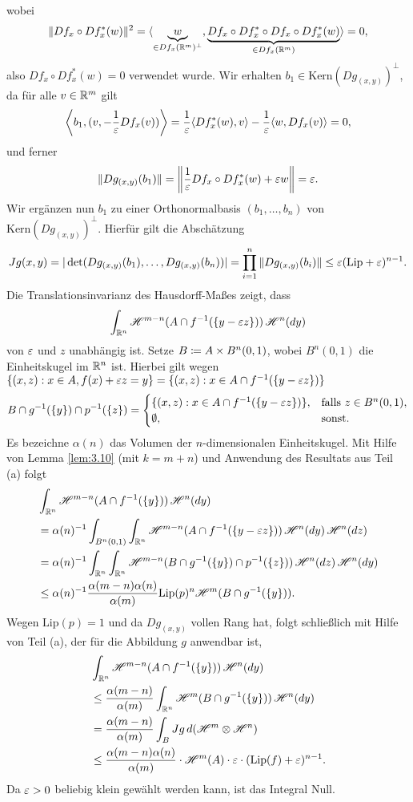 \documentclass[a4paper,twoside,DIV15,BCOR12mm]{scrbook}
\newcommand{\HM}{\mathscr H}
\begin{document}
\begin{beweis}
\begin{enumerate}[\quad(a)]
$$$$
wobei
$$ 
\|Df_x\circ Df_x^*(w)\|^2=\langle \underbrace{w}_{\in Df_x(\mathbb{R}^m)^\perp},\underbrace{Df_x\circ Df_x^*\circ Df_x\circ Df_x^*(w)}_{\in Df_x(\mathbb{R}^m)}\rangle=0,
$$
also $Df_x\circ Df_x^*(w)=0$ verwendet wurde. Wir erhalten $b_1\in \text{Kern}(Dg_{(x,y)})^\perp$, da für alle 
$v\in\mathbb{R}^m$ gilt
$$
\left\langle b_1,(v,-\frac{1}{\varepsilon}Df_x(v))\right\rangle=\frac{1}{\varepsilon}\langle Df_x^*(w),v\rangle -\frac{1}{\varepsilon}\langle
w,Df_x(v)\rangle =0,
$$
und ferner
$$
\|Dg_{(x,y)}(b_1)\|=\left\|\frac{1}{\varepsilon} Df_x\circ Df_x^*(w)+\varepsilon w\right\|=\varepsilon.
$$
Wir ergänzen nun $b_1$ zu einer Orthonormalbasis $(b_1,\ldots,b_n)$ von $\text{Kern}(Dg_{(x,y)})^\perp$. 
Hierfür gilt die Abschätzung
$$
Jg(x,y)=|\det(Dg_{(x,y)}(b_1),\ldots, Dg_{(x,y)}(b_n))|=
\prod_{i=1}^n\|Dg_{(x,y)}(b_i)\|\le \varepsilon(\text{Lip}+\varepsilon)^{n-1}.
$$
Die Translationsinvarianz des Hausdorff-Maßes zeigt, dass
$$
\int_{\MdR^n}\HM^{m-n}(A\cap f^{-1}(\{y-\ep z\}))\, \HM^n(dy)
$$
von $\varepsilon$ und $z$ unabhängig ist. Setze $B\da A\times B^n(0,1)$, wobei $B^n(0,1)$ die Einheitskugel im $\mathbb{R}^n$ ist. 
Hierbei gilt wegen $\{(x,z):x\in A,f(x)+\varepsilon z=y\}=\{(x,z):x\in A\cap f^{-1}(\{y-\varepsilon z\})\}$ 
$$
B\cap g^{-1}(\{y\})\cap p^{-1}(\{z\})
=\begin{cases}
\{(x,z):x\in A\cap f^{-1}(\{y-\varepsilon z\})\},& \text{falls } z\in B^n(0,1),\\
\emptyset,&\text{sonst}.
\end{cases}
$$
Es bezeichne $\alpha(n)$ das Volumen der $n$-dimensionalen Einheitskugel. 
Mit Hilfe von Lemma \ref{lem:3.10} (mit $k=m+n$) und Anwendung des Resultats aus Teil (a) folgt
\begin{align*}
&\int_{\MdR^n}\HM^{m-n}(A\cap f^{-1}(\{y\}))\,\HM^n(dy)\\
&=\alpha(n)^{-1}\int_{B^n(0,1)}\int_{\MdR^n}\HM^{m-n}(A\cap f^{-1}(\{y-\ep z\}))\,\HM^n(dy)\, \HM^n(dz)\\
&=\alpha(n)^{-1}\int_{\MdR^n}\int_{\MdR^n}\HM^{m-n}(B\cap g^{-1}(\{y\})\cap p^{-1}(\{z\}))\,\HM^n(dz)\, \HM^n(dy)\\
&\le \alpha(n)^{-1}\frac{\alpha(m-n)\alpha(n)}{\alpha(m)}\text{Lip}(p)^n\HM^m(B\cap g^{-1}(\{y\})).
\end{align*}
Wegen $\text{Lip}(p)=1$ und da $Dg_{(x,y)}$ vollen Rang hat, folgt schließlich mit Hilfe von 
Teil (a), der für die Abbildung $g$ anwendbar ist,
\begin{align*}
&\int_{\MdR^n}\HM^{m-n}(A\cap f^{-1}(\{y\}))\,\HM^n(dy)\\
&\le\frac{\alpha(m-n)}{\alpha(m)}\int_{\MdR^n}\HM^m(B\cap g^{-1}(\{y\}))\, \HM^n(dy)\\
&=\frac{\alpha(m-n)}{\alpha(m)}\int_{B}Jg\, d(\HM^m\otimes\HM^n)\\
&\le \frac{\alpha(m-n)\alpha(n)}{\alpha(m)}\cdot\HM^m(A)\cdot \ep\cdot(\text{Lip}(f)+\ep)^{n-1}.
\end{align*}
Da $\varepsilon>0$ beliebig klein gewählt werden kann, ist das Integral Null.
\end{enumerate}
\end{beweis}
\end{document}
